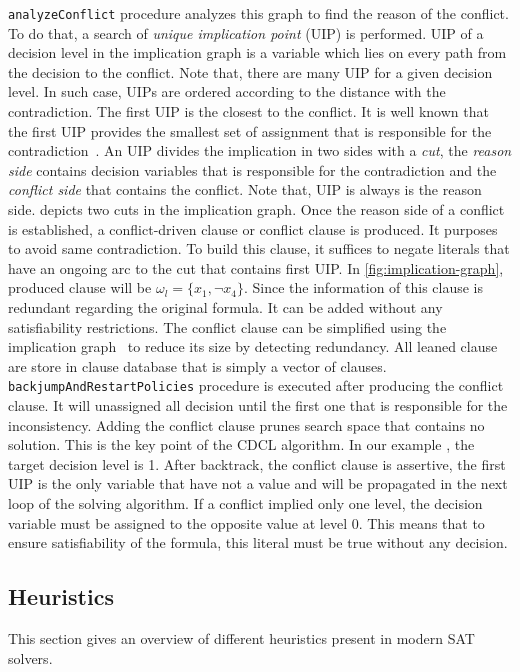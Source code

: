 \texttt{analyzeConflict} procedure analyzes this graph to find the reason of the conflict. To do that, a search of
\emph{unique implication point} (UIP) is performed. UIP of a decision level in the implication graph is a variable
which lies on every path from the decision to the conflict. Note that, there are many UIP for a given decision level.
In such case, UIPs are ordered according to the distance with the contradiction. The first UIP is the closest to
the conflict. It is well known that the first UIP provides the smallest set of assignment that is responsible for the
contradiction~\cite{zhang2001efficient}.
An UIP divides the implication in two sides with a \emph{cut}, the \emph{reason side} contains decision variables 
that is responsible for the contradiction and the \emph{conflict side} that contains the conflict. Note that, UIP is always is the 
reason side.  depicts two cuts in the implication graph.
Once the reason side of a conflict is established, a conflict-driven clause or conflict clause is produced.
It purposes to avoid same contradiction. To build this clause, it suffices to negate 
literals that have an ongoing arc to the  cut that contains first UIP. In \cref{fig:implication-graph}, produced
clause will be $\omega_l = \{x_1, \neg x_4 \}$. Since the information of this clause is redundant regarding 
the original formula. It can be added without any satisfiability restrictions. The conflict clause can be simplified
using the implication graph~\cite{sorensson2009minimizing} to reduce its size by detecting
redundancy. All leaned clause are store in clause database that is simply a vector of clauses.
\texttt{backjumpAndRestartPolicies} procedure is executed after producing the conflict clause.
It will unassigned all decision until the first one that is responsible for the inconsistency. Adding the conflict clause prunes search space that contains no solution. This is the key point of the CDCL algorithm. In our example , the target decision level is 1.
After backtrack, the conflict clause is assertive, the first UIP is the only variable that 
have not a value and will be propagated in the next loop of the solving algorithm.
If a conflict implied only one level, the decision variable must be assigned 
to the opposite value at level 0. This means that to ensure satisfiability of the formula,
this literal must be true without any decision.
 
 
\subsection{Heuristics}\label{sec:heuristics}
This section gives an overview of different heuristics present in modern SAT solvers.

